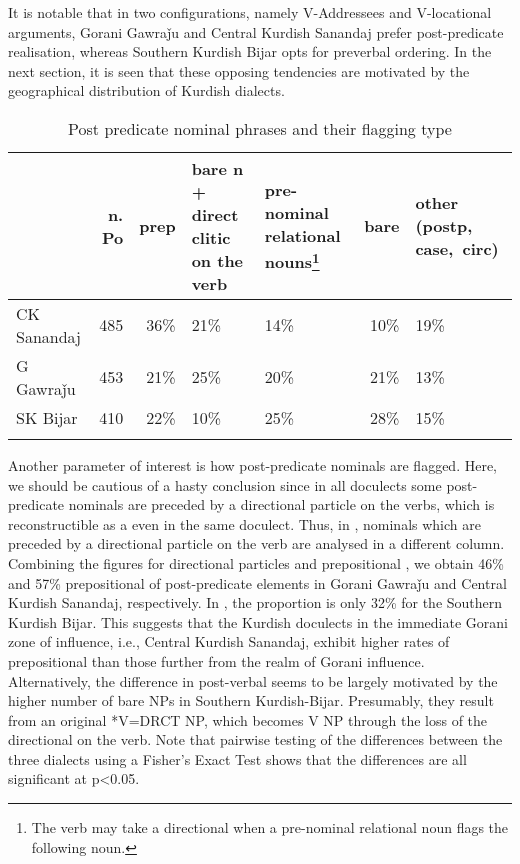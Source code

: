 \documentclass[output=paper,colorlinks,citecolor=brown]{langscibook}
\begin{document}
\begin{sloppypar}
It is notable that in two  configurations, namely V-Addressees and V-locational  arguments, Gorani Gawraǰu and Central Kurdish Sanandaj prefer post-predicate realisation, whereas Southern Kurdish Bijar opts for preverbal ordering. In the next section, it is seen that these opposing tendencies are motivated by the geographical distribution of Kurdish dialects. 

\begin{table}[t]
    \begin{tabularx}{\textwidth}{lr>{}r>{}YYr@{}Y}
\lsptoprule
& n. Po & {prep} & {bare n +} {direct clitic} {on the verb} & \mbox{pre-nominal} relational nouns\footnote{The verb may take a directional  when a pre-nominal relational noun flags the following noun.} & bare & other (postp,  \mbox{case, circ)}\\
\midrule
CK Sanandaj& 485& 36\%& 21\%& 14\%& 10\%& 19\% \\
G Gawraǰu& 453& 21\%& 25\%& 20\%& 21\%& 13\% \\
SK Bijar& 410& 22\%& 10\%& 25\%& 28\%& 15\% \\
\lspbottomrule
    \end{tabularx}
    \caption{Post predicate nominal phrases and their flagging type}
    \label{MGKC:tab:11}
\end{table}


Another parameter of interest is how post-predicate nominals are flagged. Here, we should be cautious of a hasty conclusion since in all doculects some post-predicate nominals are preceded by a directional particle on the verbs, which is reconstructible as a  even in the same doculect. Thus, in , nominals which are preceded by a directional particle on the verb are analysed in a different column. Combining the figures for directional particles and prepositional , we obtain 46\% and 57\% prepositional  of post-predicate elements in Gorani Gawraǰu and Central Kurdish Sanandaj, respectively. In , the proportion is only 32\% for the Southern Kurdish Bijar. This suggests that the Kurdish doculects in the immediate Gorani zone of influence, i.e., Central Kurdish Sanandaj, exhibit higher rates of prepositional  than those further from the realm of Gorani influence. Alternatively, the difference in post-verbal  seems to be largely motivated by the higher number of bare NPs in Southern Kurdish-Bijar. Presumably, they result from an original *V=DRCT NP, which becomes V NP through the loss of the directional  on the verb. Note that pairwise testing of the differences between the three dialects using a Fisher's Exact Test shows that the differences are all significant at p<0.05.


\end{sloppypar}
\end{document}
